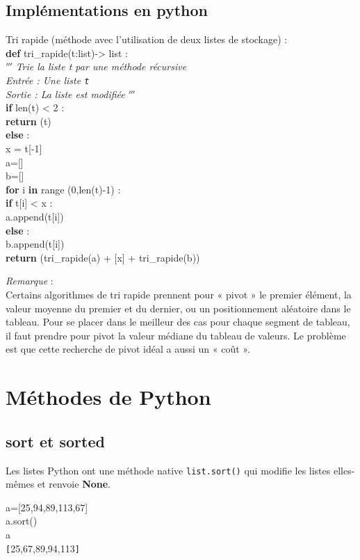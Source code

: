 \documentclass[t,11pt]{article}
\begin{document}
\newpage
\subsection{Implémentations en python}

\begin{python}
Tri rapide (méthode avec l'utilisation de deux listes de stockage) :\\
\textbf{def} tri\_rapide(t:list)-> list :\\
\indente $'''$ \textit{Trie la liste t par une méthode récursive\\
\indente Entrée : Une liste \texttt{t}\\
\indente Sortie : La liste est modifiée} $'''$\\
\indente \textbf{if} len(t) < 2 :\\
\indente \indente \textbf{return} (t)\\
\indente \textbf{else} :\\
\indente \indente x = t[-1]\\
\indente \indente a=[]\\
\indente \indente b=[]\\
\indente \indente \textbf{for} i \textbf{in} range (0,len(t)-1) :\\
\indente \indente \indente \textbf{if} t[i] < x :\\
\indente \indente \indente \indente a.append(t[i])\\
\indente \indente \indente \textbf{else} :\\ 
\indente \indente \indente \indente b.append(t[i])\\
\indente \indente \textbf{return} (tri\_rapide(a) + [x] + tri\_rapide(b))
\end{python}


\textit{Remarque} :\\
Certains algorithmes de tri rapide prennent pour « pivot » le premier élément, la valeur moyenne du premier et du dernier, ou un positionnement aléatoire dans le tableau. Pour se placer dans le meilleur des cas pour chaque segment de tableau, il faut prendre pour pivot la valeur médiane du tableau de valeurs. Le problème est que cette recherche de pivot idéal a aussi un « coût ».


\section{Méthodes de Python}

\subsection{sort et sorted}
Les listes Python ont une méthode native \texttt{list.sort()} qui modifie les listes elles-mêmes et renvoie \textbf{None}.
\vspace{-0.5cm}
\begin{pythonshell}
\invite a=[25,94,89,113,67]\\
\invite a.sort()\\
\invite a\\
\verb![!25,67,89,94,113\verb!]!
\end{pythonshell}
\end{document}
